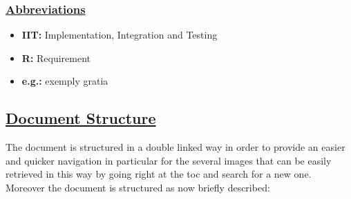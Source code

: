 		\subsubsection[Abbreviations]{\hyperlink{toc}{Abbreviations}}
			\begin{itemize}
				\item \textbf{IIT:} Implementation, Integration and Testing
				\item \textbf{R:} Requirement
				\item \textbf{e.g.:} exemply gratia
			\end{itemize}
		
	\subsection[Document Structure]{\hyperlink{toc}{Document Structure}}
		\label{sec:documentStructure}
		
		The document is structured in a double linked way in order to provide an easier and quicker navigation in particular for the several images that can be easily retrieved in this way by going right at the toc and search for a new one.\\
		
		Moreover the document is structured as now briefly described:
		
